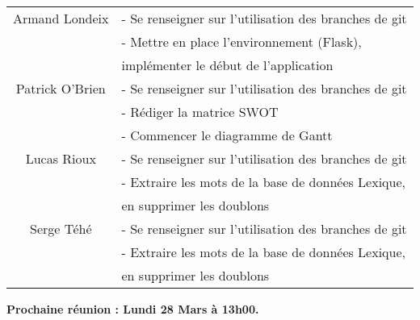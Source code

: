 \begin{center}
\begin{tabular}{|c|l|}
    \hline
    Armand Londeix & - Se renseigner sur l’utilisation des branches de git \\
    & - Mettre en place l’environnement (Flask), \\
    & implémenter le début de l’application \\
    \hline
    Patrick O'Brien & - Se renseigner sur l’utilisation des branches de git \\ 
    & - Rédiger la matrice SWOT \\
    & - Commencer le diagramme de Gantt \\
   \hline
    Lucas Rioux & - Se renseigner sur l’utilisation des branches de git \\
    & - Extraire les mots de la base de données Lexique, \\
    & en supprimer les doublons \\
    \hline
    Serge Téhé & - Se renseigner sur l’utilisation des branches de git\\
    & - Extraire les mots de la base de données Lexique, \\
    & en supprimer les doublons \\
    \hline
\end{tabular}
\end{center}

\tabto{0cm}\textbf{Prochaine réunion : Lundi 28 Mars à 13h00.}